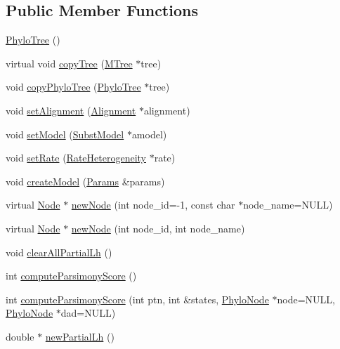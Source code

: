 \subsection*{Public Member Functions}
\begin{DoxyCompactItemize}
\item 
\hyperlink{classPhyloTree_ab6e00efe0c10f4a93d34e7d027489ac6}{PhyloTree} ()
\item 
virtual void \hyperlink{classPhyloTree_adce7d871ad6fb36424fab1aa2b688f9a}{copyTree} (\hyperlink{classMTree}{MTree} $\ast$tree)
\item 
void \hyperlink{classPhyloTree_a195bfdd19700eb12a6680ced3bc5193b}{copyPhyloTree} (\hyperlink{classPhyloTree}{PhyloTree} $\ast$tree)
\item 
void \hyperlink{classPhyloTree_a6ea47346f05772215efc900309120428}{setAlignment} (\hyperlink{classAlignment}{Alignment} $\ast$alignment)
\item 
void \hyperlink{classPhyloTree_a0e90911542265b82a3ed52da08bf9187}{setModel} (\hyperlink{classSubstModel}{SubstModel} $\ast$amodel)
\item 
void \hyperlink{classPhyloTree_ad25ae1a621d627f255d9cd8563675165}{setRate} (\hyperlink{classRateHeterogeneity}{RateHeterogeneity} $\ast$rate)
\item 
void \hyperlink{classPhyloTree_afd022a3beda4f24e47b71046d56d4fbf}{createModel} (\hyperlink{structParams}{Params} \&params)
\item 
virtual \hyperlink{classNode}{Node} $\ast$ \hyperlink{classPhyloTree_a08daeabbb3fa596916aa48834e0b152d}{newNode} (int node\_\-id=-\/1, const char $\ast$node\_\-name=NULL)
\item 
virtual \hyperlink{classNode}{Node} $\ast$ \hyperlink{classPhyloTree_a10e2a1d34d9f9751c42c262e1ef7581e}{newNode} (int node\_\-id, int node\_\-name)
\item 
void \hyperlink{classPhyloTree_a1dc84a489c3471eff561658ab98a286a}{clearAllPartialLh} ()
\item 
int \hyperlink{classPhyloTree_a106e4c54e0e3e8d48d3922d205941e60}{computeParsimonyScore} ()
\item 
int \hyperlink{classPhyloTree_a43540029a0627fb2736464a7def1f846}{computeParsimonyScore} (int ptn, int \&states, \hyperlink{classPhyloNode}{PhyloNode} $\ast$node=NULL, \hyperlink{classPhyloNode}{PhyloNode} $\ast$dad=NULL)
\item 
double $\ast$ \hyperlink{classPhyloTree_a3a0f7bf2fc3b545f1ccb6ad2dc8d887c}{newPartialLh} ()
\item 

\end{DoxyCompactItemize}
